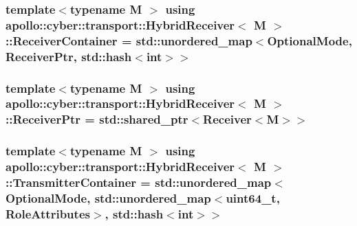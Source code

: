 \hypertarget{classapollo_1_1cyber_1_1transport_1_1HybridReceiver_a70475c40e8f9c33ebd8126df3ab71e18}{
\subsubsection[{Receiver\-Container}]{\setlength{\rightskip}{0pt plus 5cm}template$<$typename M $>$ using {\bf apollo\-::cyber\-::transport\-::\-Hybrid\-Receiver}$<$ M $>$\-::{\bf Receiver\-Container} =  std\-::unordered\-\_\-map$<$Optional\-Mode, {\bf Receiver\-Ptr}, std\-::hash$<$int$>$$>$}}\label{classapollo_1_1cyber_1_1transport_1_1HybridReceiver_a70475c40e8f9c33ebd8126df3ab71e18}
\hypertarget{classapollo_1_1cyber_1_1transport_1_1HybridReceiver_aa59a9c5e8a30dd56cd84e1a463d05e7c}{
\subsubsection[{Receiver\-Ptr}]{\setlength{\rightskip}{0pt plus 5cm}template$<$typename M $>$ using {\bf apollo\-::cyber\-::transport\-::\-Hybrid\-Receiver}$<$ M $>$\-::{\bf Receiver\-Ptr} =  std\-::shared\-\_\-ptr$<${\bf Receiver}$<$M$>$$>$}}\label{classapollo_1_1cyber_1_1transport_1_1HybridReceiver_aa59a9c5e8a30dd56cd84e1a463d05e7c}
\hypertarget{classapollo_1_1cyber_1_1transport_1_1HybridReceiver_a6295cabae20a58ee02454f59d9c09986}{
\subsubsection[{Transmitter\-Container}]{\setlength{\rightskip}{0pt plus 5cm}template$<$typename M $>$ using {\bf apollo\-::cyber\-::transport\-::\-Hybrid\-Receiver}$<$ M $>$\-::{\bf Transmitter\-Container} =  std\-::unordered\-\_\-map$<$Optional\-Mode, std\-::unordered\-\_\-map$<$uint64\-\_\-t, Role\-Attributes$>$, std\-::hash$<$int$>$$>$}}\label{classapollo_1_1cyber_1_1transport_1_1HybridReceiver_a6295cabae20a58ee02454f59d9c09986}


